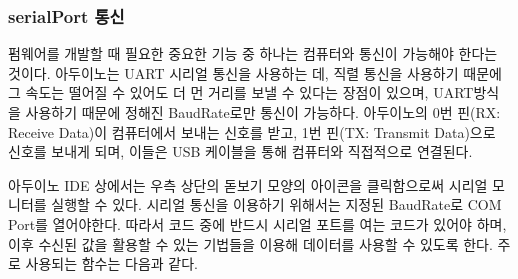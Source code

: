 \subsubsection{serialPort 통신}
펌웨어를 개발할 때 필요한 중요한 기능 중 하나는 컴퓨터와 통신이 가능해야 한다는 것이다. 아두이노는 UART 시리얼 통신을 사용하는 데, 직렬 통신을 사용하기 때문에 그 속도는 떨어질 수 있어도 더 먼 거리를 보낼 수 있다는 장점이 있으며, UART방식을 사용하기 때문에 정해진 BaudRate로만 통신이 가능하다. 아두이노의 0번 핀(RX: Receive Data)이 컴퓨터에서 보내는 신호를 받고, 1번 핀(TX: Transmit Data)으로 신호를 보내게 되며, 이들은 USB 케이블을 통해 컴퓨터와 직접적으로 연결된다.

아두이노 IDE 상에서는 우측 상단의 돋보기 모양의 아이콘을 클릭함으로써 시리얼 모니터를 실행할 수 있다. 시리얼 통신을 이용하기 위해서는 지정된 BaudRate로 COM Port를 열어야한다. 따라서 코드 중에 반드시 시리얼 포트를 여는 코드가 있어야 하며, 이후 수신된 값을 활용할 수 있는 기법들을 이용해 데이터를 사용할 수 있도록 한다. 주로 사용되는 함수는 다음과 같다.

